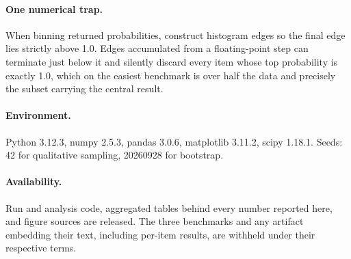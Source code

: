 \documentclass[11pt]{article}
\begin{document}
\paragraph{One numerical trap.} When binning returned probabilities, construct histogram edges so the final edge lies strictly above 1.0. Edges accumulated from a floating-point step can terminate just below it and silently discard every item whose top probability is exactly 1.0, which on the easiest benchmark is over half the data and precisely the subset carrying the central result.

\paragraph{Environment.} Python 3.12.3, numpy 2.5.3, pandas 3.0.6, matplotlib 3.11.2, scipy 1.18.1. Seeds: 42 for qualitative sampling, 20260928 for bootstrap.

\paragraph{Availability.} Run and analysis code, aggregated tables behind every number reported here, and figure sources are released. The three benchmarks and any artifact embedding their text, including per-item results, are withheld under their respective terms.
\end{document}
